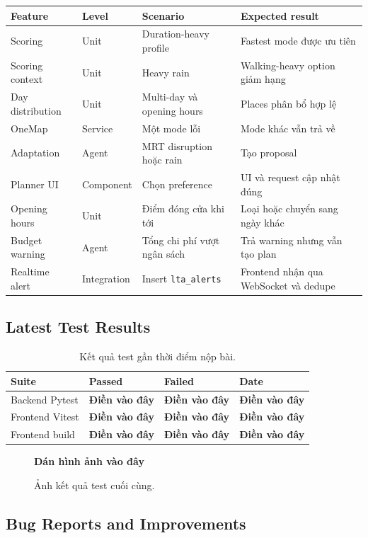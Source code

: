 \documentclass[12pt,a4paper]{article}
\newcommand{\dienvao}{\textbf{Điền vào đây}}
\newcommand{\danhinh}[1]{%
  \begin{figure}[H]
    \centering
    \begin{tcolorbox}[width=0.88\textwidth,height=5cm,valign=center,colback=gray!5,colframe=gray!45]
      \centering\Large\textbf{Dán hình ảnh vào đây}
    \end{tcolorbox}
    \caption{#1}
  \end{figure}
}
\begin{document}
\begin{longtable}{|L{2.8cm}|L{2.5cm}|L{5.0cm}|L{4.0cm}|}
\hline
\textbf{Feature} & \textbf{Level} & \textbf{Scenario} & \textbf{Expected result} \\ \hline
\endhead
Scoring & Unit & Duration-heavy profile & Fastest mode được ưu tiên \\ \hline
Scoring context & Unit & Heavy rain & Walking-heavy option giảm hạng \\ \hline
Day distribution & Unit & Multi-day và opening hours & Places phân bổ hợp lệ \\ \hline
OneMap & Service & Một mode lỗi & Mode khác vẫn trả về \\ \hline
Adaptation & Agent & MRT disruption hoặc rain & Tạo proposal \\ \hline
Planner UI & Component & Chọn preference & UI và request cập nhật đúng \\ \hline
Opening hours & Unit & Điểm đóng cửa khi tới & Loại hoặc chuyển sang ngày khác \\ \hline
Budget warning & Agent & Tổng chi phí vượt ngân sách & Trả warning nhưng vẫn tạo plan \\ \hline
Realtime alert & Integration & Insert \texttt{lta\_alerts} & Frontend nhận qua WebSocket và dedupe \\ \hline
\end{longtable}

\subsection{Latest Test Results}


\begin{table}[H]
\centering
\begin{tabular}{|C{4cm}|C{2.5cm}|C{2.5cm}|C{3cm}|}
\hline
\textbf{Suite} & \textbf{Passed} & \textbf{Failed} & \textbf{Date} \\ \hline
Backend Pytest & \dienvao & \dienvao & \dienvao \\ \hline
Frontend Vitest & \dienvao & \dienvao & \dienvao \\ \hline
Frontend build & \dienvao & \dienvao & \dienvao \\ \hline
\end{tabular}
\caption{Kết quả test gần thời điểm nộp bài.}
\end{table}

\danhinh{Ảnh kết quả test cuối cùng.}

\subsection{Bug Reports and Improvements}
\end{document}
